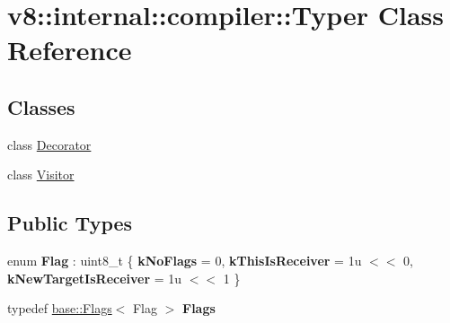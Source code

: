 \hypertarget{classv8_1_1internal_1_1compiler_1_1Typer}{}\section{v8\+:\+:internal\+:\+:compiler\+:\+:Typer Class Reference}
\label{classv8_1_1internal_1_1compiler_1_1Typer}
\subsection*{Classes}
\begin{DoxyCompactItemize}
\item 
class \mbox{\hyperlink{classv8_1_1internal_1_1compiler_1_1Typer_1_1Decorator}{Decorator}}
\item 
class \mbox{\hyperlink{classv8_1_1internal_1_1compiler_1_1Typer_1_1Visitor}{Visitor}}
\end{DoxyCompactItemize}
\subsection*{Public Types}
\begin{DoxyCompactItemize}
\item 
\mbox{\label{classv8_1_1internal_1_1compiler_1_1Typer_a3ac46ee0e9aad7b4420e8610e9f19f4a}} 
enum {\bfseries Flag} \+: uint8\+\_\+t \{ {\bfseries k\+No\+Flags} = 0, 
{\bfseries k\+This\+Is\+Receiver} = 1u $<$$<$ 0, 
{\bfseries k\+New\+Target\+Is\+Receiver} = 1u $<$$<$ 1
 \}
\item 
\mbox{\label{classv8_1_1internal_1_1compiler_1_1Typer_a336f508fa4ab10c188bf3e7e00e21292}} 
typedef \mbox{\hyperlink{classv8_1_1base_1_1Flags}{base\+::\+Flags}}$<$ Flag $>$ {\bfseries Flags}
\end{DoxyCompactItemize}

